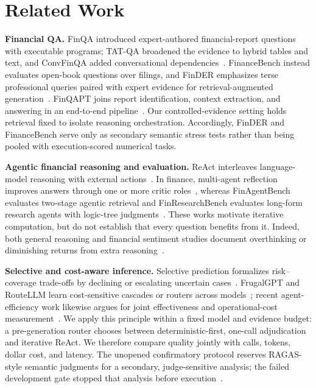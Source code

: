 \section{Related Work}
\label{sec:related-work}

\textbf{Financial QA.}
FinQA introduced expert-authored financial-report questions with executable programs; TAT-QA broadened the evidence to hybrid tables and text, and ConvFinQA added conversational dependencies~\cite{chen2021finqa,zhu2021tatqa,chen2022convfinqa}.
FinanceBench instead evaluates open-book questions over filings, and FinDER emphasizes terse professional queries paired with expert evidence for retrieval-augmented generation~\cite{islam2023financebench,choi2025finder}.
FinQAPT joins report identification, context extraction, and answering in an end-to-end pipeline~\cite{singh2024finqapt}.
Our controlled-evidence setting holds retrieval fixed to isolate reasoning orchestration.
Accordingly, FinDER and FinanceBench serve only as secondary semantic stress tests rather than being pooled with execution-scored numerical tasks.

\textbf{Agentic financial reasoning and evaluation.}
ReAct interleaves language-model reasoning with external actions~\cite{yao2023react}.
In finance, multi-agent reflection improves answers through one or more critic roles~\cite{fatemi2024reflection}, whereas FinAgentBench evaluates two-stage agentic retrieval and FinResearchBench evaluates long-form research agents with logic-tree judgments~\cite{choi2025finagentbench,sun2025finresearchbench}.
These works motivate iterative computation, but do not establish that every question benefits from it.
Indeed, both general reasoning and financial sentiment studies document overthinking or diminishing returns from extra reasoning~\cite{chen2024donotthink,vamvourellis2025overthinking}.

\textbf{Selective and cost-aware inference.}
Selective prediction formalizes risk--coverage trade-offs by declining or escalating uncertain cases~\cite{geifman2019selectivenet}.
FrugalGPT and RouteLLM learn cost-sensitive cascades or routers across models~\cite{chen2024frugalgpt,ong2025routellm}; recent agent-efficiency work likewise argues for joint effectiveness and operational-cost measurement~\cite{wang2025efficientagents,erol2025costofpass}.
We apply this principle within a fixed model and evidence budget: a pre-generation router chooses between deterministic-first, one-call adjudication and iterative ReAct.
We therefore compare quality jointly with calls, tokens, dollar cost, and latency. The unopened confirmatory protocol reserves RAGAS-style semantic judgments for a secondary, judge-sensitive analysis; the failed development gate stopped that analysis before execution~\cite{es2024ragas}.
